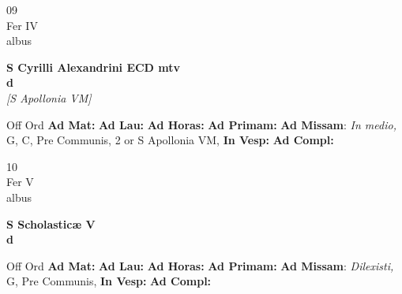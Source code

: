 \documentclass[10pt, openany]{book}
\begin{document}
    \begin{center}
        \begin{minipage}{3.5in}
            \vspace{2em}
            \begin{minipage}{0.5in}
                {\Huge 09} \\
                {\normalsize Fer IV} \\
                {\normalsize albus}
            \end{minipage}
            \begin{minipage}{3.0in}
                \textbf{ \large S Cyrilli Alexandrini ECD mtv \\
                \textnormal{\normalsize d}} \\ \textit{[S Apollonia VM]} \\ 
            \end{minipage}
            \begin{justify}Off Ord
                \textbf{Ad Mat: }
                \textbf{Ad Lau: }
                \textbf{Ad Horas: }
                \textbf{Ad Primam: }\textbf{Ad Missam}: \textit{In medio,} G, C, Pre Communis, 2 or S Apollonia VM,  
                \textbf{In Vesp: }
                \textbf{Ad Compl: }
            \end{justify}
        \end{minipage}
    \end{center}

    \begin{center}
        \begin{minipage}{3.5in}
            \vspace{2em}
            \begin{minipage}{0.5in}
                {\Huge 10} \\
                {\normalsize Fer V} \\
                {\normalsize albus}
            \end{minipage}
            \begin{minipage}{3.0in}
                \textbf{ \large S Scholasticæ V \\
                \textnormal{\normalsize d}} \\ 
            \end{minipage}
            \begin{justify}Off Ord
                \textbf{Ad Mat: }
                \textbf{Ad Lau: }
                \textbf{Ad Horas: }
                \textbf{Ad Primam: }\textbf{Ad Missam}: \textit{Dilexisti,} G, Pre Communis,  
                \textbf{In Vesp: }
                \textbf{Ad Compl: }
            \end{justify}
        \end{minipage}
    \end{center}
\end{document}
